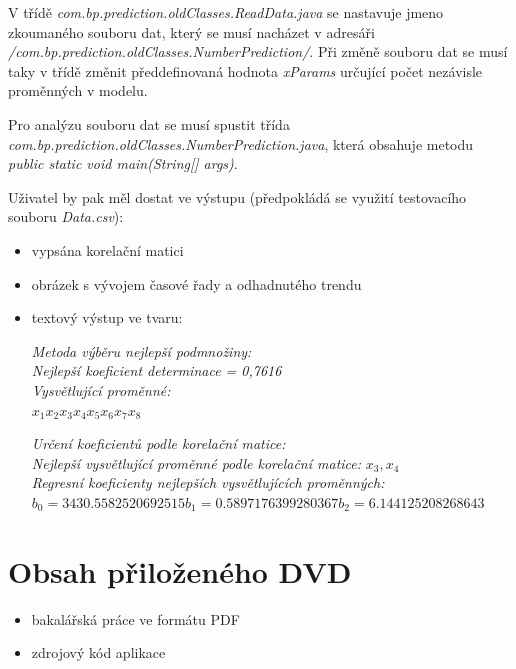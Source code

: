 \documentclass[a4paper,12pt,twoside]{scrreprt}
\begin{document}
V třídě \textit{com.bp.prediction.oldClasses.ReadData.java} se nastavuje jmeno zkoumaného souboru dat, který se musí nacházet v adresáři \textit{/com.bp.prediction.oldClasses.NumberPrediction/}. Při změně souboru dat se musí taky v třídě změnit předdefinovaná hodnota \textit{xParams} určující počet nezávisle proměnných v modelu.

Pro analýzu souboru dat se musí spustit třída \textit{com.bp.prediction.oldClasses.NumberPrediction.java}, která obsahuje metodu \textit{public static void main(String[] args)}.

Uživatel by pak měl dostat ve výstupu (předpokládá se využití testovacího souboru \textit{Data.csv}):

\begin{itemize}
\item vypsána korelační matici 
\item obrázek s vývojem časové řady a odhadnutého trendu
\item textový výstup ve tvaru:

\textit{Metoda výběru nejlepší podmnožiny:} \\
\textit{Nejlepší koeficient determinace = 0,7616} \\
\textit{Vysvětlující proměnné:} \\
$x_1 x_2 x_3 x_4 x_5 x_6 x_7 x_8$

\textit{Určení koeficientů podle korelační matice:} \\
\textit{Nejlepší vysvětlující proměnné podle korelační matice:} $x_3, x_4$ \\
\textit{Regresní koeficienty nejlepších vysvětlujících proměnných:} \\
$b_0 = 3430.5582520692515 b_1 = 0.5897176399280367 b_2 = 6.144125208268643$
\end{itemize}

\chapter{Obsah přiloženého DVD}

\begin{itemize}
\item bakalářská práce ve formátu PDF
\item zdrojový kód aplikace
\end{itemize}
\end{document}
